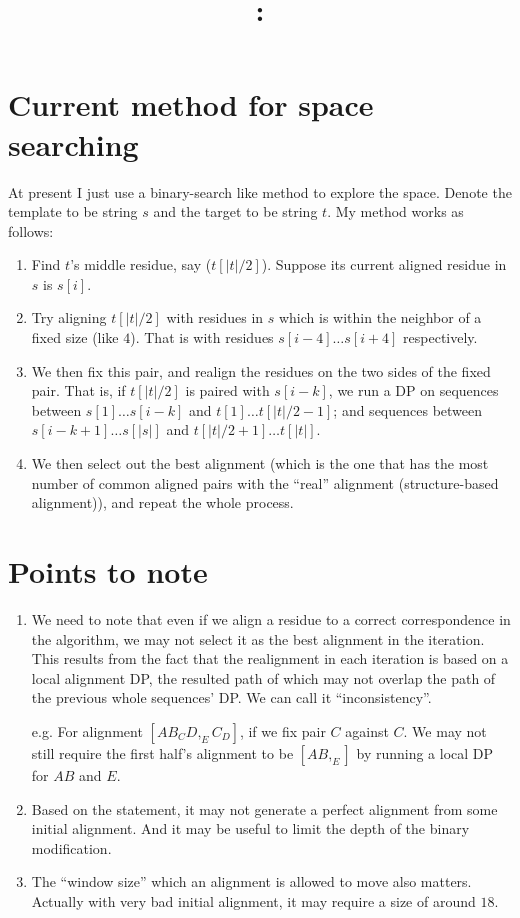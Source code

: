 \documentclass{article}
\title{\textmd{\bf \Class: \Title}}
\date{}
\author{\textbf{\StudentName}}
\begin{document}
\begin{spacing}{1.1}
\maketitle \thispagestyle{empty}

\section{Current method for space searching}
At present I just use a binary-search like method to explore the space.
Denote the template to be string $s$ and the target to be string $t$. My method works as follows:
\begin{enumerate}
  \item Find $t$'s middle residue, say ($t[|t|/2]$). Suppose its current aligned residue in $s$ is $s[i]$.
  \item Try aligning $t[|t|/2]$ with residues in $s$ which is within the neighbor of a fixed size (like $4$). That is with residues $s[i-4]\dots s[i+4]$ respectively.
  \item We then fix this pair, and realign the residues on the two sides of the fixed pair. That is, if $t[|t|/2]$ is paired with $s[i-k]$, we run a DP on sequences between $s[1]\dots s[i-k]$ and $t[1]\dots t[|t|/2-1]$; and sequences between $s[i-k+1]\dots s[|s|]$ and $t[|t|/2+1]\dots t[|t|]$.
  \item We then select out the best alignment (which is the one that has the most number of common aligned pairs with the ``real'' alignment (structure-based alignment)), and repeat the whole process.
\end{enumerate}

\section{Points to note}
\begin{enumerate}
  \item We need to note that even if we align a residue to a correct correspondence in the algorithm, we may not select it as the best alignment in the iteration. This results from the fact that the realignment in each iteration is based on a local alignment DP, the resulted path of which may not overlap the path of the previous whole sequences' DP. We can call it ``inconsistency''.

      e.g. For alignment $[AB_CD,_EC_D]$, if we fix pair $C$ against $C$. We may not still require the first half's alignment to be $[AB,_E]$ by running a local DP for $AB$ and $E$.
  \item Based on the statement, it may not generate a perfect alignment from some initial alignment. And it may be useful to limit the depth of the binary modification.
  \item The ``window size'' which an alignment is allowed to move also matters. Actually with very bad initial alignment, it may require a size of around $18$.
\end{enumerate}

\end{spacing}
\end{document}

